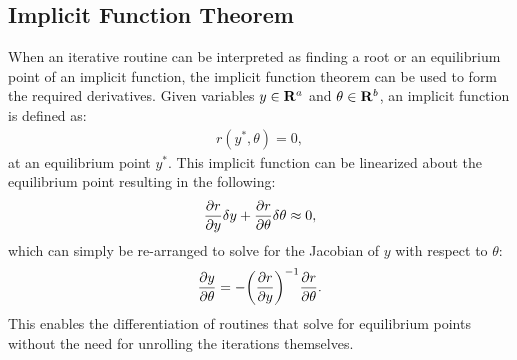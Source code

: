 \subsection{Implicit Function Theorem}
When an iterative routine can be interpreted as finding a root or an equilibrium point of an implicit function, the implicit function theorem can be used to form the required derivatives. Given variables $y \in \mathbf{R}^{a}$ and $\theta \in \mathbf{R}^{b}$, an implicit function is defined as:
\begin{align}
    r(y^*, \theta) = 0,
\end{align}
at an equilibrium point $y^*$. This implicit function can be linearized about the equilibrium point resulting in the following:
\begin{align}
    \frac{\partial { r }}{ \partial { y }} \delta y + \frac{\partial { r }}{ \partial { \theta }} \delta \theta \approx 0 ,
\end{align}
which can simply be re-arranged to solve for the Jacobian of $y$ with respect to $\theta$:
\begin{align}
    \frac{\partial { y }}{ \partial { \theta }} = -\bigg(\frac{\partial { r }}{ \partial { y }} \bigg)^{-1} \frac{\partial { r }}{ \partial { \theta }}. \label{sec:background:ift}
\end{align}
This enables the differentiation of routines that solve for equilibrium points without the need for unrolling the iterations themselves.
%
